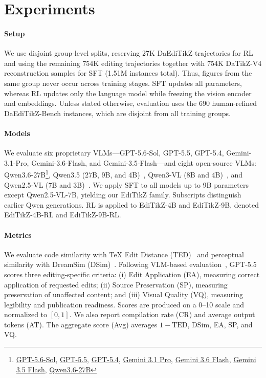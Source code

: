 \section{Experiments}
\label{sec:Experiments}

\paragraph{Setup}
We use disjoint group-level splits, reserving 27K DaEdiTikZ trajectories for RL and using the remaining 754K editing trajectories together with 754K DaTikZ-V4 reconstruction samples for SFT (1.51M instances total). Thus, figures from the same group never occur across training stages. SFT updates all parameters, whereas RL updates only the language model while freezing the vision encoder and embeddings. Unless stated otherwise, evaluation uses the 690 human-refined DaEdiTikZ-Bench instances, which are disjoint from all training groups.

\paragraph{Models}
We evaluate six proprietary VLMs---GPT-5.6-Sol, GPT-5.5, GPT-5.4, Gemini-3.1-Pro, Gemini-3.6-Flash, and Gemini-3.5-Flash---and eight open-source VLMs: Qwen3.6-27B\footnote{\href{https://openai.com/index/gpt-5-6/}{GPT-5.6-Sol}, \href{https://openai.com/index/introducing-gpt-5-5/}{GPT-5.5}, \href{https://openai.com/index/introducing-gpt-5-4/}{GPT-5.4}, \href{https://deepmind.google/models/model-cards/gemini-3-1-pro/}{Gemini 3.1 Pro}, \href{https://deepmind.google/models/model-cards/gemini-3-6-flash/}{Gemini 3.6 Flash}, \href{https://deepmind.google/models/model-cards/gemini-3-5-flash/}{Gemini 3.5 Flash}, \href{https://qwen.ai/blog?id=qwen3.6-27b}{Qwen3.6-27B}}, Qwen3.5 (27B, 9B, and 4B)~\citep{qwen3.5}, Qwen3-VL (8B and 4B)~\citep{bai2025qwen3vltechnicalreport}, and Qwen2.5-VL (7B and 3B)~\citep{bai2025qwen25vltechnicalreport}. We apply SFT to all models up to 9B parameters except Qwen2.5-VL-7B, yielding our EdiTikZ family. Subscripts distinguish earlier Qwen generations. RL is applied to EdiTikZ-4B and EdiTikZ-9B, denoted EdiTikZ-4B-RL and EdiTikZ-9B-RL.

\paragraph{Metrics}
We evaluate code similarity with TeX Edit Distance (TED)~\citep{kusner2015icml-word} and perceptual similarity with DreamSim (DSim)~\citep{NEURIPS2023_DreamSim}. Following VLM-based evaluation~\citep{ku-etal-2024-viescore}, GPT-5.5 scores three editing-specific criteria: (i) Edit Application (EA), measuring correct application of requested edits; (ii) Source Preservation (SP), measuring preservation of unaffected content; and (iii) Visual Quality (VQ), measuring legibility and publication readiness. Scores are produced on a 0--10 scale and normalized to $[0,1]$. We also report compilation rate (CR) and average output tokens (AT). The aggregate score (Avg) averages $1-\mathrm{TED}$, DSim, EA, SP, and VQ.